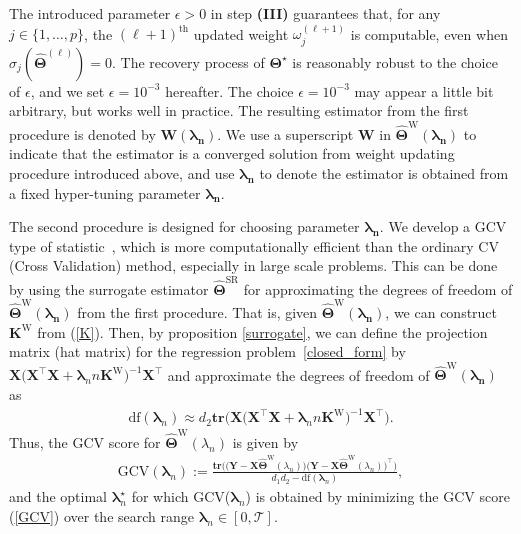 \documentclass[alpha-refs]{wiley-article}
\begin{document}
The introduced parameter $\epsilon>0$ in step {\bf(III)} guarantees that, for any $j\in\{1,\dots,p\}$,
the $(\ell+1)^{\text{th}}$ updated weight $\omega_{j}^{(\ell+1)}$ is computable, even when $\sigma_{j}(\widehat{\boldsymbol{\Theta}}^{(\ell)})=0$.
The recovery process of $\boldsymbol{\Theta}^{\star}$ is reasonably robust to the choice of $\epsilon$, and we set $\epsilon=10^{-3}$ hereafter.
The choice $\epsilon=10^{-3}$ may appear a little bit arbitrary, but works well in practice. The resulting estimator from the first procedure is denoted by $\boldsymbol{\text{W}}(\boldsymbol{\lambda_{n}})$. We use a superscript $\boldsymbol{\text{W}}$ in $\widehat{\boldsymbol{\Theta}}^{\text{W}}(\boldsymbol{\lambda_{n}})$ to indicate that the estimator is a converged solution from weight updating procedure introduced above, and use $\boldsymbol{\lambda_{n}}$ to denote the estimator is obtained from a fixed hyper-tuning parameter  $\boldsymbol{\lambda_{n}}$.

The second procedure is designed for choosing parameter $\boldsymbol{\lambda_{n}}$. We develop a GCV type of statistic~\citep{golub1979generalized}, which is more computationally efficient than the ordinary CV (Cross Validation) method, especially in large scale problems. This can be done by using the surrogate estimator $\widehat{\boldsymbol{\Theta}}^{\text{SR}}$ for approximating the degrees of freedom of $\widehat{\boldsymbol{\Theta}}^{\text{W}}(\boldsymbol{\lambda_{n}})$ from the first procedure. That is, given $\widehat{\boldsymbol{\Theta}}^{\text{W}}(\boldsymbol{\lambda_{n}})$, we can construct $\boldsymbol{K}^{\text{W}}$ from (\ref{K}).
Then, by proposition \ref{surrogate}, we can define the projection matrix (hat matrix) for the regression problem~\eqref{closed_form} by $\boldsymbol{X} \big(\boldsymbol{X}^{\top}\boldsymbol{X}+\boldsymbol{\lambda}_{n}n\boldsymbol{K}^{\text{W}}\big)^{-1}\boldsymbol{X}^{\top}$ and approximate the degrees of freedom of $\widehat{\boldsymbol{\Theta}}^{\text{W}}(\boldsymbol{\lambda_{n}})$ as
\begin{align}
    \text{df}(\boldsymbol{\lambda}_{n}) \approx d_{2} \textbf{tr}\big(\boldsymbol{X} \big(\boldsymbol{X}^{\top}\boldsymbol{X}+\boldsymbol{\lambda}_{n}n\boldsymbol{K}^{\text{W}}\big)^{-1}\boldsymbol{X}^{\top}\big).
\end{align}
Thus, the GCV score for $\widehat{\boldsymbol{\Theta}}^{\text{W}}(\lambda_{n})$ is given by
\begin{align} \label{GCV}
    \text{GCV}(\boldsymbol{\lambda}_{n}) := \frac{\textbf{tr}\big(\big(\boldsymbol{Y}-\boldsymbol{X}\widehat{\boldsymbol{\Theta}}^{\text{W}}(\lambda_{n})\big)\big(\boldsymbol{Y}-\boldsymbol{X}\widehat{\boldsymbol{\Theta}}^{\text{W}}(\lambda_{n})\big)^{\top}\big)}{d_{1}d_{2}-\text{df}(\boldsymbol{\lambda}_{n})},
\end{align}
and the optimal $\boldsymbol{\lambda}_{n}^{\star}$ for which GCV($\boldsymbol{\lambda}_{n}$) is obtained by minimizing the GCV score (\ref{GCV}) over the search range $\boldsymbol{\lambda}_{n}\in [0,\mathcal{T}]$.
\end{document}
